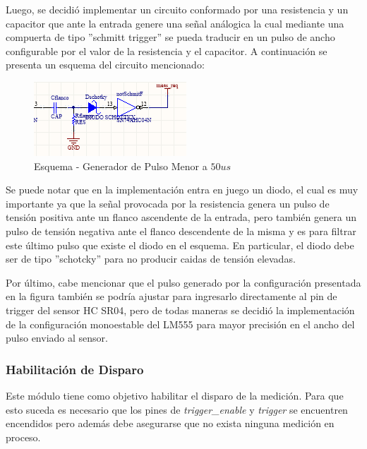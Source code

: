 Luego, se decidió implementar un circuito conformado por una resistencia
y un capacitor que ante la entrada genere una señal análogica la cual
mediante una compuerta de tipo ''schmitt trigger'' se pueda traducir
en un pulso de ancho configurable por el valor de la resistencia y
el capacitor. A continuación se presenta un esquema del circuito mencionado:

\begin{figure}[H]
\begin{centering}
\includegraphics[scale=1]{generadorDePulsoMenor50us.PNG}
\par\end{centering}
\caption{Esquema - Generador de Pulso Menor a $50us$}
\end{figure}

Se puede notar que en la implementación entra en juego un diodo, el
cual es muy importante ya que la señal provocada por la resistencia
genera un pulso de tensión positiva ante un flanco ascendente de la
entrada, pero también genera un pulso de tensión negativa ante el
flanco descendente de la misma y es para filtrar este último pulso
que existe el diodo en el esquema. En particular, el diodo debe ser
de tipo ''schotcky'' para no producir caidas de tensión elevadas.

Por último, cabe mencionar que el pulso generado por la configuración
presentada en la figura también se podría ajustar para ingresarlo
directamente al pin de trigger del sensor HC SR04, pero de todas maneras
se decidió la implementación de la configuración monoestable del LM555
para mayor precisión en el ancho del pulso enviado al sensor.

\subsubsection{Habilitación de Disparo}

Este módulo tiene como objetivo habilitar el disparo de la medición.
Para que esto suceda es necesario que los pines de \textit{trigger\_enable}
y \textit{trigger} se encuentren encendidos pero además debe asegurarse
que no exista ninguna medición en proceso.\newline

